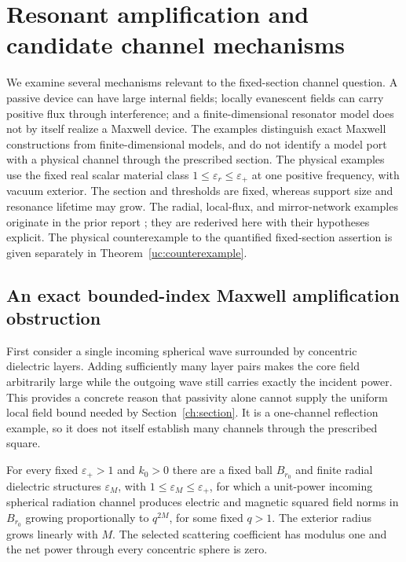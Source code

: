 \section{Resonant amplification and candidate channel mechanisms}
\label{cx:section}

We examine several mechanisms relevant to the fixed-section channel
question. A passive device can have large internal fields; locally
evanescent fields can carry positive flux through interference; and a
finite-dimensional resonator model does not by itself realize a Maxwell
device. The examples distinguish exact Maxwell constructions from
finite-dimensional models, and do not identify a model port with a physical
channel through the prescribed section. The physical examples use the fixed
real scalar material class $1\leq\varepsilon_r\leq\varepsilon_+$ at one
positive frequency, with vacuum exterior. The section and thresholds are
fixed, whereas support size and resonance lifetime may grow. The radial,
local-flux, and mirror-network examples originate in the prior report
\cite{priorreport}; they are rederived here with their hypotheses explicit.
The physical counterexample to the quantified fixed-section assertion is
given separately in Theorem~\ref{uc:counterexample}.

\subsection{An exact bounded-index Maxwell amplification obstruction}

First consider a single incoming spherical wave surrounded by concentric
dielectric layers. Adding sufficiently many layer pairs makes the core field
arbitrarily large while the outgoing wave still carries exactly the incident
power. This provides a concrete reason that passivity alone cannot supply the uniform
local field bound needed by Section~\ref{ch:section}.  It is a one-channel
reflection example, so it does not itself establish many channels through the
prescribed square.

\begin{proposition}
\label{cx:bragg}
For every fixed $\varepsilon_+>1$ and $k_0>0$ there are a fixed ball
$B_{r_0}$ and finite radial dielectric structures $\varepsilon_M$, with
$1\leq\varepsilon_M\leq\varepsilon_+$, for which a unit-power incoming
spherical radiation channel produces electric and magnetic squared field
norms in $B_{r_0}$ growing proportionally to $q^{2M}$, for some fixed $q>1$.
The exterior radius grows linearly with $M$. The selected scattering
coefficient has modulus one and the net power through every concentric
sphere is zero.
\end{proposition}

